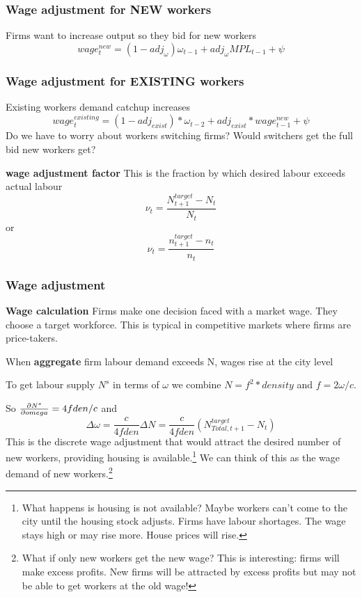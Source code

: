 {{    \subsubsection{Wage adjustment for NEW workers} 
Firms want to increase output so they bid for new workers
\[wage_t^{new}= (1-adj_\omega)\omega_{t-1} + adj_\omega MPL_{t-1}  +\psi\] 

\subsubsection{Wage adjustment for EXISTING workers }
Existing workers demand catchup increases
\[ wage_t^{existing}= (1-adj_{exist})*\omega_{t-2} + adj_{exist}* wage_{t-1}^{new}  +\psi\]
Do we have to worry about workers switching firms? Would switchers get the full  bid new workers get? 
}
}
\textbf{wage adjustment factor} This is the fraction by which desired labour exceeds actual labour
\[\nu_t =\frac{N^{target}_{t+1}-N_{t}}{N_{t}}\]
or 
\[\nu_t =\frac{n^{target}_{t+1}-n_{t}}{n_{t}}\]



\subsubsection{Wage adjustment} 

\textbf{Wage calculation}
Firms make one decision faced with a market wage. They choose a target workforce. This is typical in \glspl{competitive market} where firms are price-takers. 


When \textbf{aggregate} firm labour demand exceeds N, wages rise at the city level

To get labour supply $N^s$ in terms of  $\omega$ we combine $N=f^2 *density$ and $f=2\omega/c$. 

So $\frac{\partial N^s}{\partial omega}=4fden/c$ and \[\Delta \omega=  \frac{c}{4fden}\Delta N = \frac{c}{4fden}(N_{Total,t+1}^{target}-N_t)\]
This is the discrete wage adjustment that would attract the desired number of new workers, providing housing is available.\footnote{What happens is housing is not available? Maybe workers can't come to the city until the housing stock adjusts. Firms have labour shortages.  The wage stays high or may rise more. House prices will rise.} We can think of this as the wage demand of new workers.\footnote{What if only new workers get the new wage? This is interesting: firms will make excess profits. New firms will be attracted by excess profits but may not be able to get workers at the old wage!}

